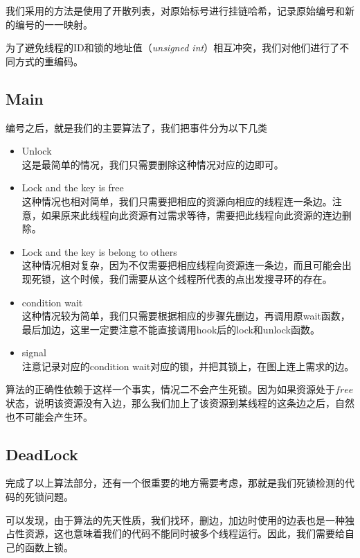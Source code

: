 \documentclass[titlepage]{article}
\begin{document}
\indent 我们采用的方法是使用了开散列表，对原始标号进行挂链哈希，记录原始编号和新的编号的一一映射。

\indent 为了避免线程的ID和锁的地址值（\emph{unsigned int}）相互冲突，我们对他们进行了不同方式的重编码。

\subsection{Main}
\indent 编号之后，就是我们的主要算法了，我们把事件分为以下几类
\begin{itemize}
	\item Unlock\\
这是最简单的情况，我们只需要删除这种情况对应的边即可。
	\item Lock and the key is free\\
这种情况也相对简单，我们只需要把相应的资源向相应的线程连一条边。注意，如果原来此线程向此资源有过需求等待，需要把此线程向此资源的连边删除。
	\item Lock and the key is belong to others\\
这种情况相对复杂，因为不仅需要把相应线程向资源连一条边，而且可能会出现死锁，这个时候，我们需要从这个线程所代表的点出发搜寻环的存在。
	\item condition wait\\
这种情况较为简单，我们只需要根据相应的步骤先删边，再调用原wait函数，最后加边，这里一定要注意不能直接调用hook后的lock和unlock函数。
	\item signal\\
注意记录对应的condition wait对应的锁，并把其锁上，在图上连上需求的边。
\end{itemize}

\indent 算法的正确性依赖于这样一个事实，情况二不会产生死锁。因为如果资源处于$free$状态，说明该资源没有入边，那么我们加上了该资源到某线程的这条边之后，自然也不可能会产生环。

\subsection{DeadLock}
\indent 完成了以上算法部分，还有一个很重要的地方需要考虑，那就是我们死锁检测的代码的死锁问题。

\indent 可以发现，由于算法的先天性质，我们找环，删边，加边时使用的边表也是一种独占性资源，这也意味着我们的代码不能同时被多个线程运行。因此，我们需要给自己的函数上锁。
\end{document}
